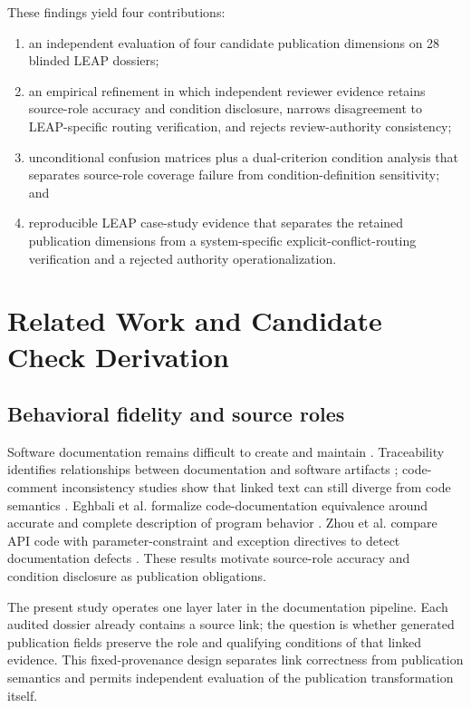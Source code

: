 \documentclass[a4paper,fleqn]{cas-dc}
\begin{document}
These findings yield four contributions:
\begin{enumerate}[leftmargin=*]
\item an independent evaluation of four candidate publication dimensions on 28 blinded LEAP dossiers;
\item an empirical refinement in which independent reviewer evidence retains source-role accuracy and condition disclosure, narrows disagreement to LEAP-specific routing verification, and rejects review-authority consistency;
\item unconditional confusion matrices plus a dual-criterion condition analysis that separates source-role coverage failure from condition-definition sensitivity; and
\item reproducible LEAP case-study evidence that separates the retained publication dimensions from a system-specific explicit-conflict-routing verification and a rejected authority operationalization.
\end{enumerate}
\section{Related Work and Candidate Check Derivation}
\subsection{Behavioral fidelity and source roles}
Software documentation remains difficult to create and maintain \citep{Aghajani2019}. Traceability identifies relationships between documentation and software artifacts \citep{MaderGotel2012}; code-comment inconsistency studies show that linked text can still diverge from code semantics \citep{Wen2019,Xu2024}. Eghbali et al. formalize code-documentation equivalence around accurate and complete description of program behavior \citep{Eghbali2026}. Zhou et al. compare API code with parameter-constraint and exception directives to detect documentation defects \citep{Zhou2017}. These results motivate source-role accuracy and condition disclosure as publication obligations.

The present study operates one layer later in the documentation pipeline. Each audited dossier already contains a source link; the question is whether generated publication fields preserve the role and qualifying conditions of that linked evidence. This fixed-provenance design separates link correctness from publication semantics and permits independent evaluation of the publication transformation itself.
\end{document}
